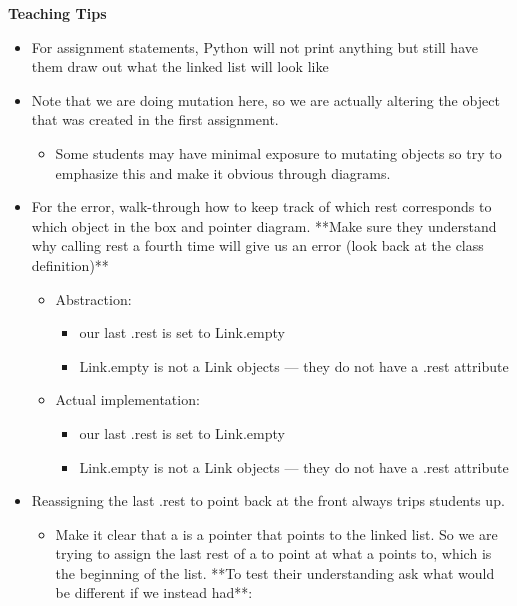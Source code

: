 \begin{guide}
   \textbf{Teaching Tips}
   \begin{itemize}
      \item For assignment statements, Python will not print anything but still have them draw out what the linked list will look like
      \item Note that we are doing mutation here, so we are actually altering the object that was created in the first assignment. 
      \begin{itemize}
          \item Some students may have minimal exposure to mutating objects so try to emphasize this and make it obvious through diagrams.
      \end{itemize}
      \item For the error, walk-through how to keep track of which rest corresponds to which object in the box and pointer diagram. **Make sure they understand why calling rest a fourth time will give us an error (look back at the class definition)**
      \begin{itemize}
          \item Abstraction:
          \begin{itemize}
               \item our last .rest is set to Link.empty
               \item Link.empty is not a Link objects — they do not have a .rest attribute
           \end{itemize}
           \item Actual implementation:
           \begin{itemize}
               \item our last .rest is set to Link.empty
               \item Link.empty is not a Link objects — they do not have a .rest attribute
           \end{itemize}
      \end{itemize}
      \item Reassigning the last .rest to point back at the front always trips students up. 
      \begin{itemize}
       \item Make it clear that a is a pointer that points to the linked list. So we are trying to assign the last rest of a to point at what a points to, which is the beginning of the list. **To test their understanding ask what would be different if we instead had**:
       \begin{itemize}

\end{itemize}
\end{itemize}
\end{itemize}
\end{guide}
